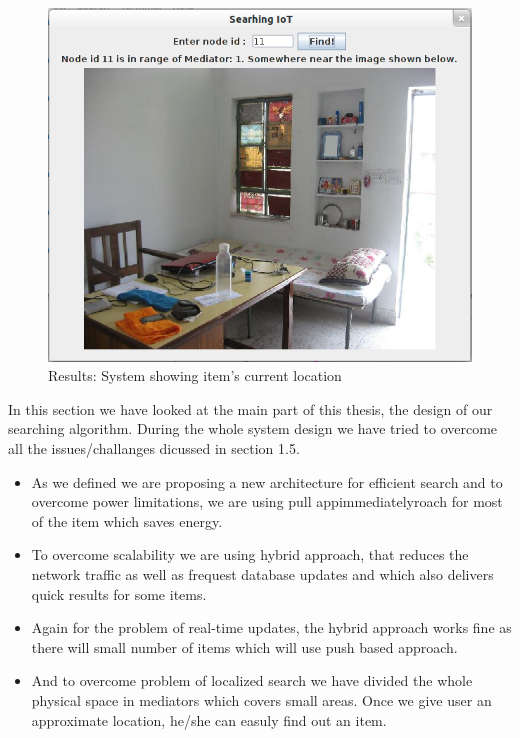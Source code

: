 \documentclass [a4paper,12pt]{book}
\begin{document}
\vspace{0.5cm}
\begin{figure}[!h]
\begin{center}
\includegraphics[scale=0.7]{images/16.png}
\caption{Results: System showing item's current location}
\label{result}
\end{center}
\end{figure}

In this section we have looked at the main part of this thesis, the design of our searching algorithm. During the whole system design we have tried to overcome all the issues/challanges dicussed in section 1.5. 
\begin{itemize}
\item As we defined we are proposing a new architecture for efficient search and to overcome power limitations, we are using pull appimmediatelyroach for most of the item which saves energy. 
\item To overcome scalability we are using hybrid approach, that reduces the network traffic as well as frequest database updates and which also delivers quick results for some items.
\item Again for the problem of real-time updates, the hybrid approach works fine as there will small number of items which will use push based approach.
\item And to overcome problem of localized search we have divided the whole physical space in mediators which covers small areas. Once we give user an approximate location, he/she can easuly find out an item.
\end{itemize}
\end{document}
